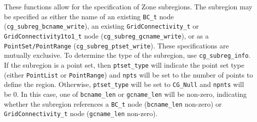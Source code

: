 These functions allow for the specification of Zone subregions. The
subregion may be specified as either the name of an existing
\texttt{BC\_t} node (\texttt{cg\_subreg\_bcname\_write}), an
existing \texttt{GridConnectivity\_t} or \texttt{GridConnectivity1to1\_t}
node (\texttt{cg\_subreg\_gcname\_write}), or as a
\texttt{PointSet/PointRange} (\texttt{cg\_subreg\_ptset\_write}).
These specifications are mutually exclusive.
To determine the type of the subregion, use
\texttt{cg\_subreg\_info}. If the subregion is a point set,
then \texttt{ptset\_type} will indicate the point set type (either
\texttt{PointList} or \texttt{PointRange}) and \texttt{npts} will be
set to the number of points to define the region. Otherwise,
\texttt{ptset\_type} will be set to \texttt{CG\_Null} and
\texttt{npnts} will be 0. In this case, one of \texttt{bcname\_len}
or \texttt{gcname\_len} will be non-zero, indicating whether the
subregion references a \texttt{BC\_t} node
(\texttt{bcname\_len} non-zero) or
\texttt{GridConnectivity\_t} node (\texttt{gcname\_len} non-zero).

